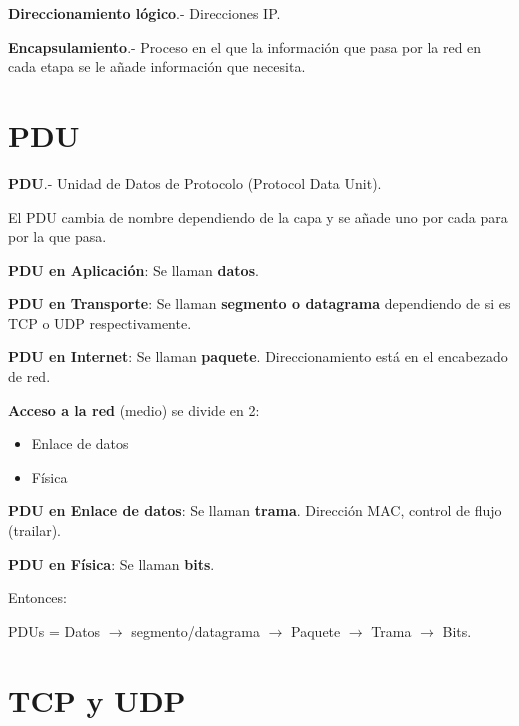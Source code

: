 \documentclass{article}
\begin{document}
\textbf{Direccionamiento lógico}.- Direcciones IP.
\vspace{1em}

\textbf{Encapsulamiento}.- Proceso en el que la información que pasa por la red en cada
etapa se le añade información  que necesita.
\vspace{1em}

\section{PDU}

\textbf{PDU}.- Unidad de Datos de Protocolo (Protocol Data Unit).
\vspace{1em}

El PDU cambia de nombre dependiendo de la capa y se añade uno por cada para por
la que pasa.
\vspace{1em}

\textbf{PDU en Aplicación}: Se llaman \textbf{datos}.
\vspace{1em}

\textbf{PDU en Transporte}: Se llaman \textbf{segmento o datagrama } dependiendo de si es
TCP o UDP respectivamente.
\vspace{1em}

\textbf{PDU en Internet}: Se llaman \textbf{paquete}. Direccionamiento está en
el encabezado de red.
\vspace{1em}

\textbf{Acceso a la red} (medio) se divide en 2:

\begin{itemize}
	\item
	Enlace de datos
	\item
	Física
\end{itemize}
\vspace{1em}

\textbf{PDU en Enlace de datos}: Se llaman \textbf{trama}. Dirección MAC, control
de flujo (trailar).
\vspace{1em}

\textbf{PDU en Física}: Se llaman \textbf{bits}.
\vspace{1em}

Entonces:

PDUs = Datos $\rightarrow$ segmento/datagrama $\rightarrow$ Paquete
$\rightarrow$ Trama $\rightarrow$ Bits.

\section{TCP y UDP}
\end{document}
